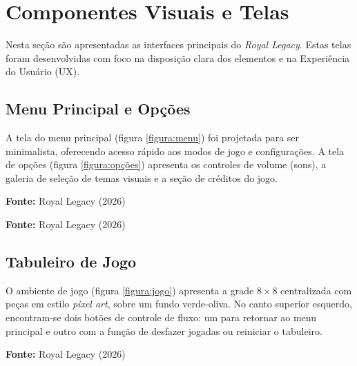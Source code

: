 \section{Componentes Visuais e Telas}
\label{secao:prototipos}

Nesta seção são apresentadas as interfaces principais do \textit{Royal Legacy}. Estas telas foram desenvolvidas com foco na disposição clara dos elementos e na Experiência do Usuário (UX).

\subsection{Menu Principal e Opções}

A tela do menu principal (figura \ref{figura:menu}) foi projetada para ser minimalista, oferecendo acesso rápido aos modos de jogo e configurações. A tela de opções (figura \ref{figura:opções}) apresenta os controles de volume (sons), a galeria de seleção de temas visuais e a seção de créditos do jogo.

\begin{center}
	\vspace{-0.2cm} %
	\small \textbf{Fonte:} Royal Legacy (2026)
\end{center}

\begin{center}
	\vspace{-0.2cm} %
	\small \textbf{Fonte:} Royal Legacy (2026)
\end{center}

\subsection{Tabuleiro de Jogo}

O ambiente de jogo (figura \ref{figura:jogo}) apresenta a grade $8\times8$ centralizada com peças em estilo \textit{pixel art}, sobre um fundo verde-oliva. No canto superior esquerdo, encontram-se dois botões de controle de fluxo: um para retornar ao menu principal e outro com a função de desfazer jogadas ou reiniciar o tabuleiro.

\begin{center}
	\vspace{-0.2cm} %
	\small \textbf{Fonte:} Royal Legacy (2026)
\end{center}

